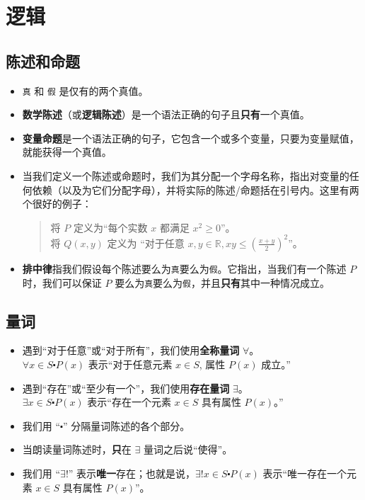 \section{逻辑}

\subsection{陈述和命题}

\begin{itemize}
    \item \verb|真| 和 \verb|假| 是仅有的两个真值。
    \item \textbf{数学陈述}（或\textbf{逻辑陈述}）是一个语法正确的句子且\textbf{只有}一个真值。
    \item \textbf{变量命题}是一个语法正确的句子，它包含一个或多个变量，只要为变量赋值，就能获得一个真值。
    \item 当我们定义一个陈述或命题时，我们为其分配一个字母名称，指出对变量的任何依赖（以及为它们分配字母），并将实际的陈述/命题括在引号内。这里有两个很好的例子：
          \begin{quote}
              将 $P$ 定义为``每个实数 $x$ 都满足 $x^2 \ge 0$''。\\
              将 $Q(x, y)$ 定义为 ``对于任意 $x,y \in \mathbb{R}, xy \le (\frac{x+y}{2})^2$''。
          \end{quote}
    \item \textbf{排中律}指我们假设每个陈述要么为\verb|真|要么为\verb|假|。它指出，当我们有一个陈述 $P$ 时，我们可以保证 $P$ 要么为\verb|真|要么为\verb|假|，并且\textbf{只有}其中一种情况成立。
\end{itemize}

\subsection{量词}

\begin{itemize}
    \item 遇到``对于任意''或``对于所有''，我们使用\textbf{全称量词} $\forall$。\\
        $\forall x \in S \centerdot P(x)$ 表示``对于任意元素 $x \in S$, 属性 $P(x)$ 成立。''
    \item 遇到``存在''或``至少有一个''，我们使用\textbf{存在量词} $\exists$。\\
        $\exists x \in S \centerdot P(x)$ 表示``存在一个元素 $x \in S$ 具有属性 $P(x)$。''
    \item 我们用 ``$\centerdot$'' 分隔量词陈述的各个部分。
    \item 当朗读量词陈述时，\textbf{只}在 $\exists$ 量词之后说``使得''。
    \item 我们用 ``$\exists !$'' 表示\textbf{唯一}存在；也就是说，$\exists ! x \in S \centerdot P(x)$ 表示``唯一存在一个元素 $x \in S$ 具有属性 $P(x)$''。
\end{itemize}

